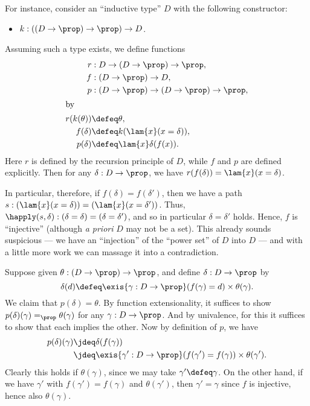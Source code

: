 For instance, consider an ``inductive type'' $D$ with the following constructor:
\begin{itemize}
\item $k:((D\to\prop)\to\prop)\to D$.
\end{itemize}
Assuming such a type exists, we define functions
\begin{align*}
  r&:D\to (D\to\prop)\to\prop,\\
  f&:(D\to\prop) \to D,\\
  p&:(D\to \prop) \to (D\to\prop)\to \prop,\\
  \intertext{by}
  r(k(\theta)) &\defeq \theta,\\
  f(\delta) &\defeq k(\lam{x} (x=\delta)),\\
  p(\delta) &\defeq \lam{x} \delta(f(x)).
\end{align*}
Here $r$ is defined by the recursion principle of $D$, while $f$ and $p$ are defined explicitly.
Then for any $\delta:D\to\prop$, we have $r(f(\delta)) = \lam{x}(x=\delta)$.

In particular, therefore, if $f(\delta)=f(\delta')$, then we have a path $s:(\lam{x}(x=\delta)) = (\lam{x}(x=\delta'))$.
Thus, $\happly(s,\delta) : (\delta=\delta) = (\delta=\delta')$, and so in particular $\delta=\delta'$ holds.
Hence, $f$ is ``injective'' (although \emph{a priori} $D$ may not be a set).
This already sounds suspicious --- we have an ``injection'' of the ``power set'' of $D$ into $D$ --- and with a little more work we can massage it into a contradiction.

Suppose given $\theta:(D\to\prop)\to\prop$, and define $\delta:D\to\prop$ by
\begin{equation}
  \delta(d) \defeq \exis{\gamma:D\to\prop} (f(\gamma) = d) \times \theta(\gamma).\label{eq:Pinj}
\end{equation}
We claim that $p(\delta)=\theta$.
By function extensionality, it suffices to show $p(\delta)(\gamma) =_\prop \theta(\gamma)$ for any $\gamma:D\to\prop$.
And by univalence, for this it suffices to show that each implies the other.
Now by definition of $p$, we have
\begin{align*}
  p(\delta)(\gamma) &\jdeq \delta(f(\gamma))\\
  &\jdeq \exis{\gamma':D\to\prop} (f(\gamma') = f(\gamma)) \times \theta(\gamma').
\end{align*}
Clearly this holds if $\theta(\gamma)$, since we may take $\gamma'\defeq \gamma$.
On the other hand, if we have $\gamma'$ with $f(\gamma') = f(\gamma)$ and $\theta(\gamma')$, then $\gamma'=\gamma$ since $f$ is injective, hence also $\theta(\gamma)$.


